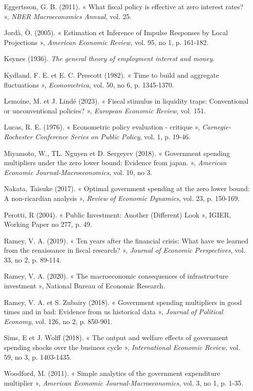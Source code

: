 \documentclass[12pt,letterpaper]{article}
\begin{document}
\begin{list}{}{\setlength{\leftmargin}{2em}\setlength{\itemindent}{-2em}\setlength{\itemsep}{0.3em}}
\item Eggertsson, G. B. (2011). « What fiscal policy is effective at zero interest rates? », \emph{NBER Macroeconomics Annual}, vol. 25.
\item Jord\`a, \`O. (2005). « Estimation et Inference of Impulse Responses by Local Projections », \emph{American Economic Review}, vol. 95, no 1, p. 161-182.
\item Keynes (1936). \emph{The general theory of employment interest and money}.
\item Kydland, F. E. et E. C. Prescott (1982). « Time to build and aggregate fluctuations », \emph{Econometrica}, vol. 50, no 6, p. 1345-1370.
\item Lemoine, M. et J. Lind\'e (2023). « Fiscal stimulus in liquidity traps: Conventional or unconventional policies? », \emph{European Economic Review}, vol. 151.
\item Lucas, R. E. (1976). « Econometric policy evaluation - critique », \emph{Carnegie-Rochester Conference Series on Public Policy}, vol. 1, p. 19-46.
\item Miyamoto, W., TL. Nguyen et D. Sergeyev (2018). « Government spending multipliers under the zero lower bound: Evidence from japan. », \emph{American Economic Journal-Macroeconomics}, vol. 10, no 3.
\item Nakata, Taisuke (2017). « Optimal government spending at the zero lower bound: A non-ricardian analysis », \emph{Review of Economic Dynamics}, vol. 23, p. 150-169.
\item Perotti, R (2004). « Public Investment: Another (Different) Look », IGIER, Working Paper no 277, p. 49.
\item Ramey, V. A. (2019). « Ten years after the financial crisis: What have we learned from the renaissance in fiscal research? », \emph{Journal of Economic Perspectives}, vol. 33, no 2, p. 89-114.
\item Ramey, V. A. (2020). « The macroeconomic consequences of infrastructure investment », National Bureau of Economic Research.
\item Ramey, V. A. et S. Zubairy (2018). « Government spending multipliers in good times and in bad: Evidence from us historical data », \emph{Journal of Political Economy}, vol. 126, no 2, p. 850-901.
\item Sims, E et J. Wolff (2018). « The output and welfare effects of government spending shocks over the business cycle », \emph{International Economic Review}, vol. 59, no 3, p. 1403-1435.
\item Woodford, M. (2011). « Simple analytics of the government expenditure multiplier », \emph{American Economic Journal-Macroeconomics}, vol. 3, no 1, p. 1-35.
\end{list}
\end{document}
